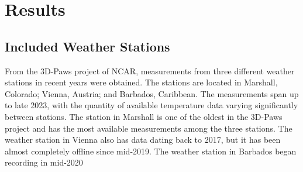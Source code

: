 \section{Results}
\label{sec:results}

\subsection{Included Weather Stations}

From the 3D-Paws project of NCAR, measurements from three different weather stations in recent years were obtained. The stations are located in Marshall, Colorado; Vienna, Austria; and Barbados, Caribbean. The measurements span up to late 2023, with the quantity of available temperature data varying significantly between stations. The station in Marshall is one of the oldest in the 3D-Paws project and has the most available measurements among the three stations. The weather station in Vienna also has data dating back to 2017, but it has been almost completely offline since mid-2019. The weather station in Barbados began recording in mid-2020

